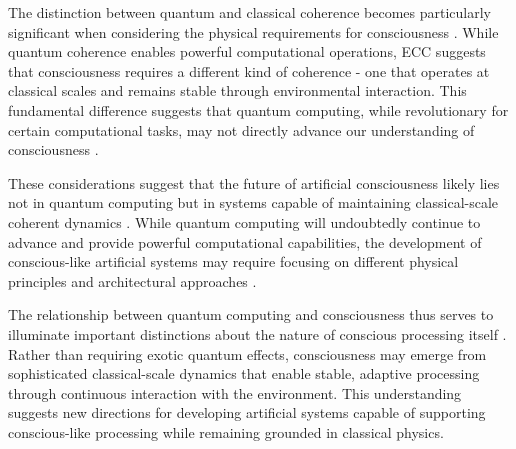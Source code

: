 The distinction between quantum and classical coherence becomes particularly significant when considering the physical requirements for consciousness \cite{Aaronson2021a}. While quantum coherence enables powerful computational operations, ECC suggests that consciousness requires a different kind of coherence - one that operates at classical scales and remains stable through environmental interaction. This fundamental difference suggests that quantum computing, while revolutionary for certain computational tasks, may not directly advance our understanding of consciousness \cite{Arute2019}.

These considerations suggest that the future of artificial consciousness likely lies not in quantum computing but in systems capable of maintaining classical-scale coherent dynamics \cite{Bernstein2018}. While quantum computing will undoubtedly continue to advance and provide powerful computational capabilities, the development of conscious-like artificial systems may require focusing on different physical principles and architectural approaches \cite{Deutsch2020}.

The relationship between quantum computing and consciousness thus serves to illuminate important distinctions about the nature of conscious processing itself \cite{DiVincenzo2019}. Rather than requiring exotic quantum effects, consciousness may emerge from sophisticated classical-scale dynamics that enable stable, adaptive processing through continuous interaction with the environment. This understanding suggests new directions for developing artificial systems capable of supporting conscious-like processing while remaining grounded in classical physics.